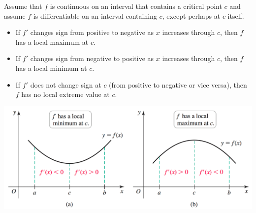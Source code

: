 \documentclass[../mathNotesPreamble]{subfiles}
\begin{document}
\begin{thmBox*}
  Assume that $f$ is continuous on an interval that contains a critical point $c$ and assume $f$ is differentiable on an interval containing $c$, except perhaps at $c$ itself.

\vspace*{10pt}
  \begin{minipage}{0.85\linewidth}
    \begin{itemize}
      \item If $f'$ changes sign from positive to negative as $x$ increases through $c$, then $f$ has a local maximum at $c$.
      \item If $f'$ changes sign from negative to positive as $x$ increases through $c$, then $f$ has a local minimum at $c$.
      \item If $f'$ does not change sign at $c$ (from positive to negative or vice versa), then $f$ has no local extreme value at $c$.
    \end{itemize}
  \end{minipage}
\end{thmBox*}

\begin{center}
  \includegraphics[width=0.6\linewidth]{../images/briggs_04_03/fig4_26.png}
\end{center}
\vspace*{-35pt}
\pagebreak
\end{document}
